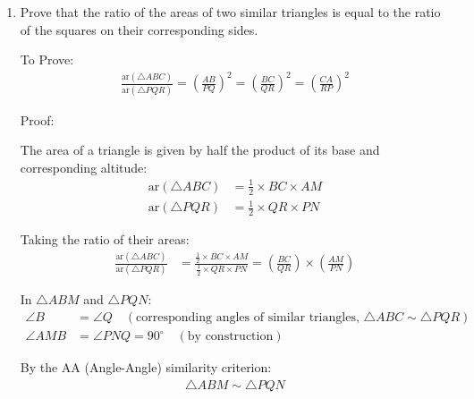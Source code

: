 \begin{enumerate}[label=\thesubsection.\arabic*, ref=\thesubsection.\theenumi]
	 Sum of zeroes:
	\begin{align*}
		\alpha + \beta &= \frac{2}{3} + \left(-\frac{1}{7}\right) = \frac{14 - 3}{21} = \frac{11}{21} = -\frac{b}{a}
	\end{align*}
	
	2. Product of zeroes:
	\begin{align*}
		\alpha \beta &= \left(\frac{2}{3}\right)\left(-\frac{1}{7}\right) = -\frac{2}{21} = 	\frac{c}{a} 
	\end{align*}
	
	
	
	\item Prove that the ratio of the areas of two similar
	triangles is equal to the ratio of the squares on their
	corresponding sides.
	
	
	\solution
	
    To Prove:
	\begin{align*}
		\frac{\text{ar}(\triangle ABC)}{\text{ar}(\triangle PQR)} = \left(\frac{AB}{PQ}\right)^2 = \left(\frac{BC}{QR}\right)^2 = \left(\frac{CA}{RP}\right)^2
	\end{align*}
	
	Proof:
	
	The area of a triangle is given by half the product of its base and corresponding altitude:
	\begin{align*}
		\text{ar}(\triangle ABC) &= \frac{1}{2} \times BC \times AM \\
		\text{ar}(\triangle PQR) &= \frac{1}{2} \times QR \times PN
	\end{align*}
	
	Taking the ratio of their areas:
	\begin{align*}
		\frac{\text{ar}(\triangle ABC)}{\text{ar}(\triangle PQR)} &= \frac{\frac{1}{2} \times BC \times AM}{\frac{1}{2} \times QR \times PN} = \left(\frac{BC}{QR}\right) \times \left(\frac{AM}{PN}\right)
	\end{align*}
	
	In $\triangle ABM$ and $\triangle PQN$:
	\begin{align*}
		\angle B &= \angle Q \quad (\text{corresponding angles of similar triangles, } \triangle ABC \sim \triangle PQR) \\
		\angle AMB &= \angle PNQ = 90^\circ \quad (\text{by construction})
	\end{align*}
	
	By the AA (Angle-Angle) similarity criterion:
	\begin{align*}
		\triangle ABM \sim \triangle PQN
	\end{align*}
	

\end{enumerate}
